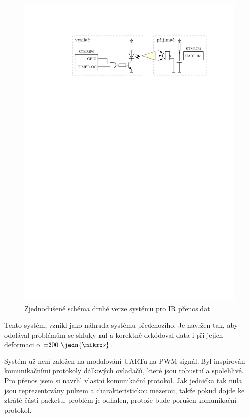 \begin{figure}[H]
    \begin{center}
        \includegraphics[width=\textwidth]{img/ir-system}
    \end{center}
    \caption{Zjednodušené schéma druhé verze systému pro IR přenos dat}
\end{figure}

Tento systém, vznikl jako náhrada systému předchozího. Je navržen tak, aby odolával problémům se shluky nul a korektně dekódoval data i při jejich deformaci o $\pm200~\jedn{\mikro s}$.

Systém už není založen na modulování UARTu na PWM signál. Byl inspirován komunikačními protokoly dálkových ovladačů, které jsou robustní a spolehlivé. Pro přenos jsem si navrhl vlastní komunikační protokol. Jak jednička tak nula jsou reprezentovány pulzem a charakteristickou mezerou, takže pokud dojde ke ztrátě části packetu, problém je odhalen, protože bude porušen komunikační protokol.

